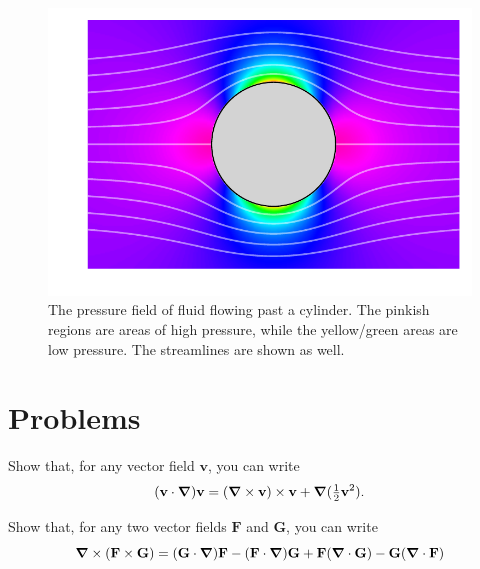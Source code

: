 \begin{figure}[t]
\centering\includegraphics[width=0.8\linewidth]{Figures/Chapter3/fig_cylinder_pressure}
\caption{The pressure field of fluid flowing past a cylinder.  The pinkish regions are areas of high pressure, while the yellow/green areas are low pressure.  The streamlines are shown as well.}
\label{fig_cyl_pressure}
\end{figure}








\section*{Problems}

\begin{problem}
\label{prob_vc3}
Show that, for any vector field $\mathbf{v}$, you can write
\[
(\mathbf{v} \cdot \boldsymbol{\nabla} ) \mathbf{v} = (\boldsymbol{\nabla} \times \mathbf{v}) \times \mathbf{v} + \boldsymbol{\nabla}(\tfrac{1}{2} \mathbf{v}^2).
\]
\end{problem}

\begin{problem}
\label{prob_vc4}
Show that, for any two vector fields $\mathbf{F}$ and $\mathbf{G}$, you can write
\[
\boldsymbol{\nabla} \times (\mathbf{F} \times \mathbf{G}) = (\mathbf{G} \cdot \boldsymbol{\nabla}) \mathbf{F} - (\mathbf{F} \cdot \boldsymbol{\nabla}) \mathbf{G} + \mathbf{F} (\boldsymbol{\nabla} \cdot \mathbf{G}) - \mathbf{G} (\boldsymbol{\nabla} \cdot \mathbf{F})
\]
\end{problem}


